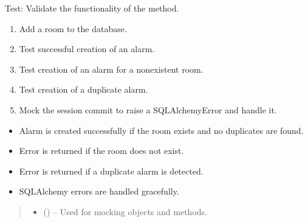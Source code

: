 \documentclass[letterpaper,10pt,english]{sphinxmanual}
\begin{document}
\begin{fulllineitems}
\label{\detokenize{test:test.test_alarm.test_create_alarm}}
\pysigstartsignatures
\pysiglinewithargsret
{}
{\sphinxparamcomma {}}
{}
\pysigstopsignatures
\sphinxAtStartPar
Test: Validate the functionality of the  method.
\begin{description}
\begin{enumerate}
%
\item {} 
\sphinxAtStartPar
Add a room to the database.

\item {} 
\sphinxAtStartPar
Test successful creation of an alarm.

\item {} 
\sphinxAtStartPar
Test creation of an alarm for a non\sphinxhyphen{}existent room.

\item {} 
\sphinxAtStartPar
Test creation of a duplicate alarm.

\item {} 
\sphinxAtStartPar
Mock the session commit to raise a SQLAlchemyError and handle it.

\end{enumerate}

\begin{itemize}
\item {} 
\sphinxAtStartPar
Alarm is created successfully if the room exists and no duplicates are found.

\item {} 
\sphinxAtStartPar
Error is returned if the room does not exist.

\item {} 
\sphinxAtStartPar
Error is returned if a duplicate alarm is detected.

\item {} 
\sphinxAtStartPar
SQLAlchemy errors are handled gracefully.

\end{itemize}

\end{description}
\begin{quote}\begin{description}
\begin{itemize}
\item {} 
\sphinxAtStartPar
{} () – Used for mocking objects and methods.


\end{itemize}
\end{description}
\end{quote}
\end{fulllineitems}
\end{document}
